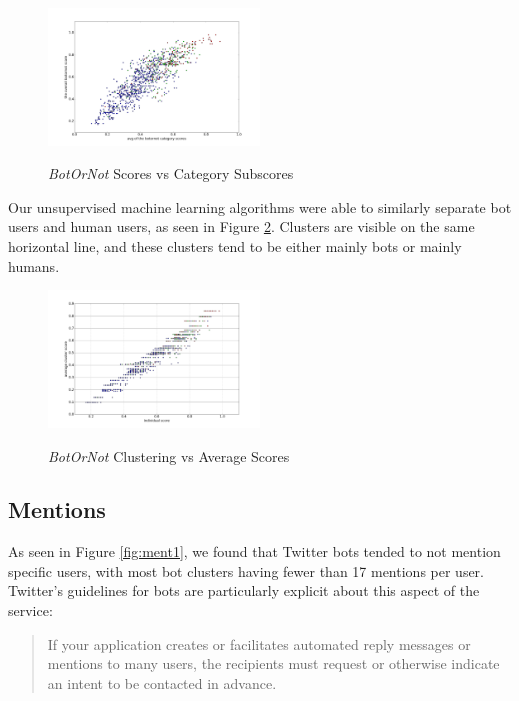 \documentclass{sig-alternate-05-2015}
\begin{document}
\begin{figure}[h!]
	\caption{\emph{BotOrNot} Scores vs Category Subscores}
	\centering
		\includegraphics[width=0.5\textwidth]{imgs/svacs}
	\label{fig:scoresubscore}
\end{figure}

Our unsupervised machine learning algorithms were able to similarly separate bot users and human users, as seen in Figure \ref{fig:clustscore}. Clusters are visible on the same horizontal line, and these clusters tend to be either mainly bots or mainly humans.

\begin{figure}[h!]
	\caption{\emph{BotOrNot} Clustering vs Average Scores}
	\centering
		\includegraphics[width=0.5\textwidth]{imgs/ourscorevssubscore}
	\label{fig:clustscore}
\end{figure}

\subsection{Mentions}
As seen in Figure \ref{fig:ment1}, we found that Twitter bots tended to not mention specific users, with most bot clusters having fewer than 17 mentions per user. Twitter's guidelines for bots are particularly explicit about this aspect of the service:

\begin{quote}If your application creates or facilitates automated reply messages or mentions to many users, the recipients must request or otherwise indicate an intent to be contacted in advance.\cite{twitter:automation}\end{quote}
\end{document}

